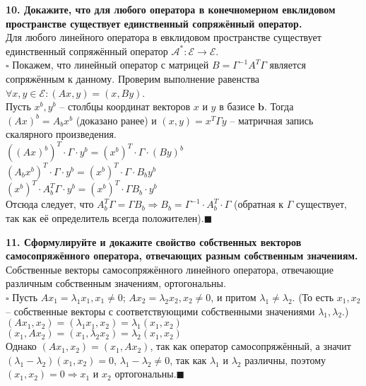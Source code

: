 \documentclass[11pt,a4paper]{article}
\renewcommand{\b}{\mathbf{b}}
\newcommand{\A}{\mathcal{A}}
\newcommand{\E}{\mathcal{E}}
\newcommand{\proof}{$\square$ }
\newcommand{\qed}{\hfill$\blacksquare$}
\begin{document}
\textbf{10. Докажите, что для любого оператора в конечномерном евклидовом пространстве существует единственный сопряжённый оператор.\\}
Для любого линейного оператора в евклидовом пространстве существует единственный сопряжённый оператор $\A^* : \E \rightarrow \E$.\\
\proof Покажем, что линейный оператор с матрицей $B = \Gamma^{-1} A^T \Gamma$ является сопряжённым к данному. Проверим выполнение равенства $\forall x, y \in \E: (Ax, y) = (x, By)$.\\
Пусть $x^b, y^b$ -- столбцы координат векторов $x$ и $y$ в базисе $\b$. Тогда $(Ax)^b = A_b x^b$ (доказано ранее) и $(x, y) = x^T \Gamma y$ -- матричная запись скалярного произведения.\\
$((Ax)^b)^T \cdot \Gamma \cdot y^b = (x^b)^T \cdot \Gamma \cdot (By)^b$\\
$(A_b x^b)^T \cdot \Gamma \cdot y^b = (x^b)^T \cdot \Gamma \cdot B_b y^b$\\
$(x^b)^T \cdot A_b^T \Gamma \cdot y^b = (x^b)^T \cdot \Gamma B_b \cdot y^b$\\
Отсюда следует, что $A_b^T \Gamma = \Gamma B_b \Rightarrow B_b = \Gamma^{-1} \cdot A_b^T \cdot \Gamma$ (обратная к $\Gamma$ существует, так как её определитель всегда положителен).\qed

\textbf{11. Сформулируйте и докажите свойство собственных векторов самосопряжённого оператора, отвечающих разным собственным значениям.\\}
Собственные векторы самосопряжённого линейного оператора, отвечающие различным собственным значениям, ортогональны.\\
\proof Пусть $Ax_1 = \lambda_1 x_1, x_1 \neq 0$; $Ax_2 = \lambda_2 x_2, x_2 \neq 0$, и притом $\lambda_1 \neq \lambda_2$. (То есть $x_1, x_2$ -- собственные векторы с соответствующими собственными значениями $\lambda_1, \lambda_2$.)\\
$(Ax_1, x_2) = (\lambda_1 x_1, x_2) = \lambda_1 (x_1, x_2)$\\
$(x_1, Ax_2) = (x_1, \lambda_2 x_2) = \lambda_2 (x_1, x_2)$\\
Однако $(Ax_1, x_2) = (x_1, Ax_2)$, так как оператор самосопряжённый, а значит $(\lambda_1 - \lambda_2) (x_1, x_2) = 0$, $\lambda_1 - \lambda_2 \neq 0$, так как $\lambda_1$ и $\lambda_2$ различны, поэтому $(x_1, x_2) = 0 \Rightarrow x_1$ и $x_2$ ортогональны.\qed
\end{document}
